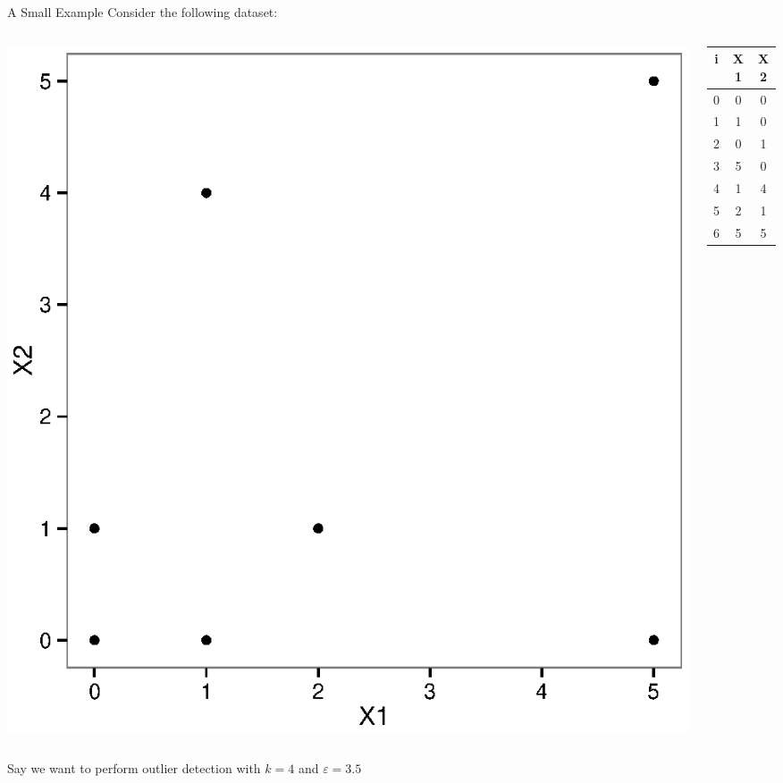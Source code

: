 \documentclass{beamer}
\begin{document}
\begin{frame}{A Small Example}
    Consider the following dataset:
    \begin{columns}
        \begin{column}{.7\textwidth}
            \includegraphics[width=.7\linewidth]{images/example_plot.eps}
        \end{column}
        \begin{column}{.3\textwidth}
            \begin{tabular}{ | c | c  c |}
            \hline
            i & X1 & X2 \\
            \hline
            0 & 0 & 0 \\
            1 & 1 & 0 \\
            2 & 0 & 1 \\
            3 & 5 & 0 \\
            4 & 1 & 4 \\
            5 & 2 & 1 \\
            6 & 5 & 5 \\
            \hline
            \end{tabular}
        \end{column}
    \end{columns}
    Say we want to perform outlier detection with $k=4$ and $\varepsilon=3.5$
\end{frame}
\end{document}
